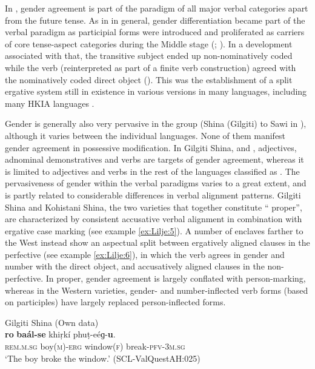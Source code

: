 \documentclass[output=collectionpaper]{langsci/langscibook}
\begin{document}
In , gender agreement is part of the paradigm of all major verbal categories apart from the future tense. As in  in general, gender differentiation became part of the verbal paradigm as participial forms were introduced and proliferated as carriers of core tense-aspect categories during the Middle  stage (\citealt[481--482]{Pirejko1979}; \citealt[61--64]{Klaiman1987}). In a development associated with that, the transitive subject ended up non-nominatively coded while the verb (reinterpreted as part of a finite verb construction) agreed with the nominatively coded direct object (\citealt[341--346]{Masica1991}). This was the establishment of a split ergative system still in existence in various versions in many  languages, including many HKIA languages \citep{Liljegren2014}.

Gender is generally also very pervasive in the  group (Shina (Gilgiti) to Sawi in ), although it varies between the individual languages. None of them manifest gender agreement in possessive modification. In Gilgiti Shina,  and , adjectives, adnominal demonstratives and verbs are targets of gender agreement, whereas it is limited to adjectives and verbs in the rest of the languages classified as . The pervasiveness of gender within the verbal paradigms varies to a great extent, and is partly related to considerable differences in verbal alignment patterns. Gilgiti Shina and Kohistani Shina, the two varieties that together constitute `` proper'', are characterized by consistent accusative verbal alignment in combination with ergative case marking (see example \ref{ex:Lilje:5}). A number of  enclaves farther to the West instead show an aspectual split between ergatively aligned clauses in the perfective (see example \ref{ex:Lilje:6}), in which the verb agrees in gender and number with the direct object, and accusatively aligned clauses in the non-perfective. In  proper, gender agreement is largely conflated with person-marking, whereas in the Western varieties, gender- and number-inflected verb forms (based on participles) have largely replaced person-inflected forms.

\ea
\label{ex:Lilje:5}
Gilgiti Shina (Own data)\\
\gll \textbf{ro} \textbf{baál}\textbf{{}-}\textbf{se} khiṛkí phuṭ-eéɡ-\textbf{u}.    \\
\textsc{rem.}\textsc{m.sg} boy(\textsc{m})-\textsc{erg} window(\textsc{f}) break\textsc{{}-pfv-3}\textsc{m.sg}    \\
\glt `The boy broke the window.' (SCL-ValQuestAH:025)
\z
\end{document}
